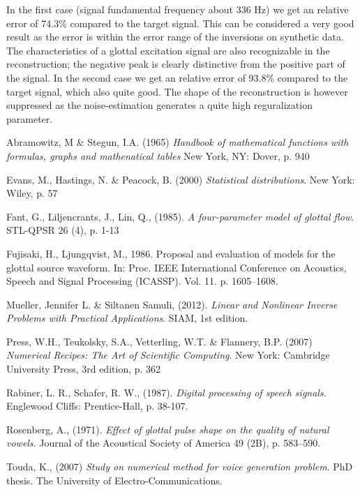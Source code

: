 \documentclass[12pt,a4]{article}
\begin{document}
In the first case (signal fundamental frequency about 336 Hz) we get an relative error of 74.3\% compared to the target signal. This can be considered a very good result as the error is within the error range of the inversions on synthetic data. The characteristics of a glottal excitation signal are also recognizable in the reconstruction; the negative peak is clearly distinctive from the positive part of the signal. In the second case we get an relative error of 93.8\% compared to the target signal, which also quite good. The shape of the reconstruction is however suppressed as the noise-estimation generates a quite high reguralization parameter.

\newpage
\begin{thebibliography}{9}

\begin{footnotesize}
    
    Abramowitz, M \& Stegun, I.A. (1965)
    \emph{Handbook of mathematical functions with formulas, graphs and mathenatical tables}
    New York, NY: Dover, p. 940
    
    Evans, M., Hastings, N. \& Peacock, B. (2000)
    \emph{Statistical distributions}.
    New York: Wiley, p. 57

    Fant, G., Liljencrants, J., Lin, Q., (1985).
    \emph{A four-parameter model of glottal flow}.
    STL-QPSR 26 (4), p. 1-13
    
    Fujisaki, H., Ljungqvist, M., 1986.
    Proposal and evaluation of models for the glottal source waveform.
    In: Proc. IEEE International Conference on Acoustics, Speech and Signal Processing (ICASSP). Vol. 11. p. 1605–1608.
    
	Mueller, Jennifer L. \& Siltanen Samuli, (2012).
	\emph{Linear and Nonlinear Inverse Problems with Practical Applications}.
	SIAM, 1st edition.
    
    Press, W.H., Teukolsky, S.A., Vetterling, W.T. \& Flannery, B.P. (2007)
    \emph{Numerical Recipes: The Art of Scientific Computing}.
    New York: Cambridge University Press, 3rd edition, p. 362
    
    Rabiner, L. R., Schafer, R. W., (1987).
    \emph{Digital processing of speech signals}.
    Englewood Cliffs: Prentice-Hall, p. 38-107.

    Rosenberg, A., (1971).
    \emph{Effect of glottal pulse shape on the quality of natural vowels}.
    Journal of the Acoustical Society of America 49 (2B), p. 583–590.
	
    Touda, K., (2007)
    \emph{Study on numerical method for voice generation problem}.
    PhD thesis.
    The University of Electro-Communications.


\end{footnotesize}

\end{thebibliography}
\end{document}
